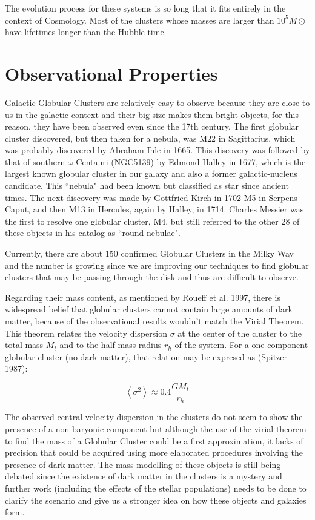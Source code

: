 The evolution process for these systems is so long that it fits entirely in the context of Cosmology. Most of the clusters whose masses are larger than $10^{5}M\odot$ have lifetimes longer than the Hubble time.

\section{Observational Properties}

Galactic Globular Clusters are relatively easy to observe because they are close to us in the galactic context and their big size makes them bright objects, for this reason, they have been observed even since the 17th century. The first globular cluster discovered, but then taken for a nebula, was M22 in Sagittarius, which was probably discovered by Abraham Ihle in 1665. This discovery was followed by that of southern $\omega$ Centauri (NGC5139) by Edmond Halley in 1677, which is the largest known globular cluster in our galaxy and also a former galactic-nucleus candidate. This ``nebula" had been known but classified as star since ancient times. The next discovery was made by Gottfried Kirch in 1702 M5 in Serpens Caput, and then M13 in Hercules, again by Halley, in 1714. Charles Messier was the first to resolve one globular cluster, M4, but still referred to the other 28 of these objects in his catalog as ``round nebulae". 

Currently, there are about 150 confirmed Globular Clusters in the Milky Way and the number is growing since we are improving our techniques to find globular clusters that may be passing through the disk and thus are difficult to observe.

Regarding their mass content, as mentioned by Roueff et al. 1997, there is  widespread belief that globular clusters cannot contain large amounts of dark matter, because of the observational results wouldn't match the  Virial Theorem. This theorem relates the velocity dispersion $ \sigma $ at the center of the cluster to the total mass $M_{t}$ and to the half-mass radius $r_{h}$ of the system. For a one component globular cluster (no dark matter), that relation may be expresed as (Spitzer 1987):

\begin{equation}
\left\langle \sigma^{2}\right\rangle \approx0.4\frac{GM_{t}}{r_{h}}
\end{equation}

The observed central velocity dispersion in the clusters do not seem to show the presence of a non-baryonic component but although the use of the virial theorem to find the mass of a Globular Cluster could be a first approximation, it lacks of precision that could be acquired using more elaborated procedures involving the presence of dark matter. The mass modelling of these objects is still being debated since the existence of dark matter in the clusters is a mystery and further work (including the effects of the stellar populations) needs to be done to clarify the scenario and give us a stronger idea on how these objects and galaxies form. 

